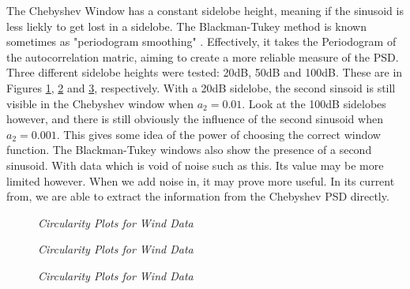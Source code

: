 \documentclass[./main.tex]{subfiles}
\begin{document}
The Chebyshev Window has a constant sidelobe height, meaning if the sinusoid is less liekly to get lost in a sidelobe. The Blackman-Tukey method is known sometimes as "periodogram smoothing" \cite{Mandic2014}. Effectively, it takes the Periodogram of the autocorrelation matric, aiming to create a more reliable measure of the PSD. Three different sidelobe heights were tested: 20dB, 50dB and 100dB. These are in Figures \ref{fig:1_3_f_20}, \ref{fig:1_3_f_50} and \ref{fig:1_3_f_100}, respectively. With a 20dB sidelobe, the second sinsoid is still visible in the Chebyshev window when $a_2 = 0.01$. Look at the 100dB sidelobes however, and there is still obviously the influence of the second sinusoid when $a_2=0.001$. This gives some idea of the power of choosing the correct window function. The Blackman-Tukey windows also show the presence of a second sinusoid. With data which is void of noise such as this. Its value may be more limited however. When we add noise in, it may prove more useful. In its current from, we are able to extract the information from the Chebyshev PSD directly.

\begin{figure}[h]
	\centering 
	\resizebox{\textwidth}{!}{}
	\caption{\textit{Circularity Plots for Wind Data}}
	\label{fig:1_3_f_20}
\end{figure}

\begin{figure}[h]
	\centering 
	\resizebox{\textwidth}{!}{}
	\caption{\textit{Circularity Plots for Wind Data}}
	\label{fig:1_3_f_50}
\end{figure}

\begin{figure}[h]
	\centering 
	\resizebox{\textwidth}{!}{}
	\caption{\textit{Circularity Plots for Wind Data}}
	\label{fig:1_3_f_100}
\end{figure}
\end{document}
